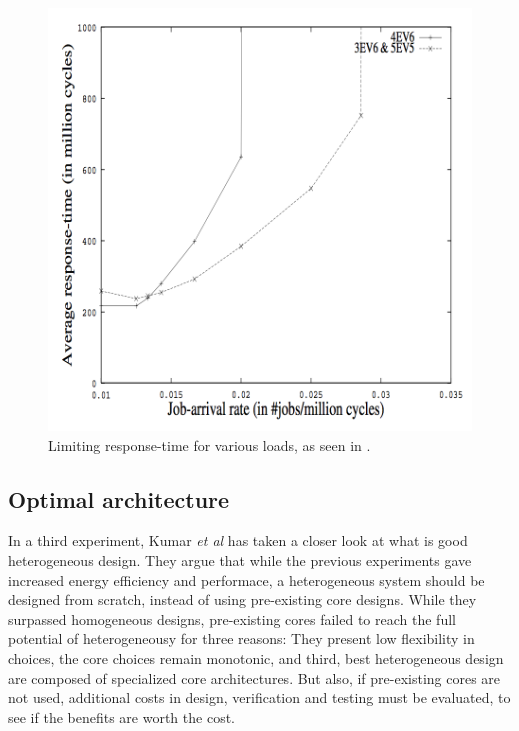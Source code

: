 \begin{figure}[htb]
    \centering
    \includegraphics[width=1.0\textwidth]{Figures/Heterogeneous/Kumar3}
    \caption{Limiting response-time for various loads, as seen in \cite{heterogeneous-perf}.}
    \label{fig:Kumar3}
\end{figure}

\subsection{Optimal architecture}
\label{subsec:rw_arch}
In a third experiment, Kumar \textit{et al}\cite{heterogeneous-arch} has taken a closer look at what is good heterogeneous design.
They argue that while the previous experiments gave increased energy efficiency and performace, a heterogeneous system should be designed from scratch, instead of using pre-existing core designs.
While they surpassed homogeneous designs, pre-existing cores failed to reach the full potential of heterogeneousy for three reasons: They present low flexibility in choices, the core choices remain monotonic, and third, best heterogeneous design are composed of specialized core architectures\cite{heterogeneous-arch}.
But also, if pre-existing cores are not used, additional costs in design, verification and testing must be evaluated, to see if the benefits are worth the cost.

